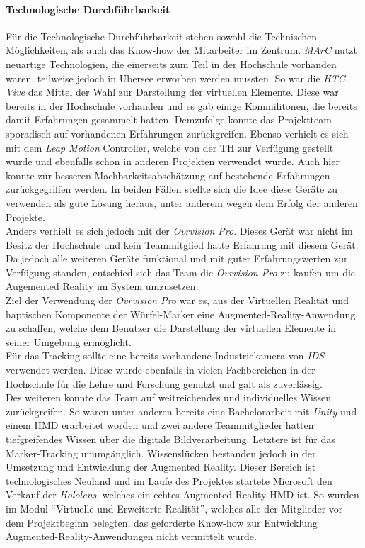 \paragraph{Technologische Durchführbarkeit} Für die Technologische Durchführbarkeit stehen sowohl die Technischen Möglichkeiten, als auch das Know-how der Mitarbeiter im Zentrum. \textit{MArC} nutzt neuartige Technologien, die einerseits zum Teil in der Hochschule vorhanden waren, teilweise jedoch in Übersee erworben werden mussten. So war die \textit{HTC Vive} das Mittel der Wahl zur Darstellung der virtuellen Elemente. Diese war bereits in der Hochschule vorhanden und es gab einige Kommilitonen, die bereits damit Erfahrungen gesammelt hatten. Demzufolge konnte das Projektteam sporadisch auf vorhandenen Erfahrungen zurückgreifen. Ebenso verhielt es sich mit dem \textit{Leap Motion} Controller, welche von der TH zur Verfügung gestellt wurde und ebenfalls schon in anderen Projekten verwendet wurde. Auch hier konnte zur besseren Machbarkeitsabschätzung auf bestehende Erfahrungen zurückgegriffen werden. In beiden Fällen stellte sich die Idee diese Geräte zu verwenden als gute Lösung heraus, unter anderem wegen dem Erfolg der anderen Projekte.\\
Anders verhielt es sich jedoch mit der \textit{Ovrvision Pro}. Dieses Gerät war nicht im Besitz der Hochschule und kein Teammitglied hatte Erfahrung mit diesem Gerät. Da jedoch alle weiteren Geräte funktional und mit guter Erfahrungswerten zur Verfügung standen, entschied sich das Team die \textit{Ovrvision Pro} zu kaufen um die Augemented Reality im System umzusetzen.\\
Ziel der Verwendung der \textit{Ovrvision Pro} war es, aus der Virtuellen Realität und haptischen Komponente der Würfel-Marker eine Augmented-Reality-Anwendung zu schaffen, welche dem Benutzer die Darstellung der virtuellen Elemente in seiner Umgebung ermöglicht.\\
Für das Tracking sollte eine bereits vorhandene Industriekamera von \textit{IDS} verwendet werden. Diese wurde ebenfalls in vielen Fachbereichen in der Hochschule für die Lehre und Forschung genutzt und galt als zuverlässig.\\
Des weiteren konnte das Team auf weitreichendes und individuelles Wissen zurückgreifen. So waren unter anderen bereits eine Bachelorarbeit mit \textit{Unity} und einem HMD erarbeitet worden und zwei andere Teammitglieder hatten tiefgreifendes Wissen über die digitale Bildverarbeitung. Letztere ist für das Marker-Tracking unumgänglich. Wissenslücken bestanden jedoch in der Umsetzung und Entwicklung der Augmented Reality. Dieser Bereich ist technologisches Neuland und im Laufe des Projektes startete Microsoft den Verkauf der \textit{Hololens}, welches ein echtes Augmented-Reality-HMD ist. So wurden im Modul "`Virtuelle und Erweiterte Realität"', welches alle der Mitglieder vor dem Projektbeginn belegten, das geforderte Know-how zur Entwicklung Augmented-Reality-Anwendungen nicht vermittelt wurde.

